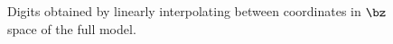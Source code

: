 \begin{figure}[thb]
	\centering
	\caption{Digits obtained by linearly interpolating between coordinates in $\bz$ space of the full model.}
\end{figure}
